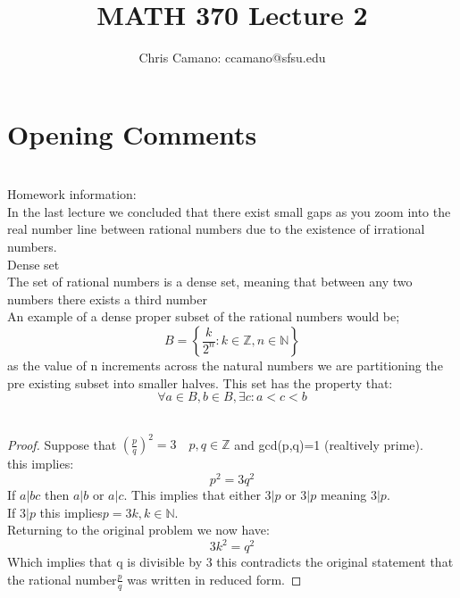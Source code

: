 \documentclass[12pt]{article}
\author{Chris Camano: ccamano@sfsu.edu}
\title{MATH 370  Lecture 2 }
\date
\newcommand{\sect}[1]{\section*{#1}}
\newcommand{\Z}{\mathbb{Z}}
\newcommand{\N}{\mathbb{N}}
\theoremstyle{definition}
\theoremstyle{remark}
\numberwithin{equation}{section}
\begin{document}
\maketitle
\sect{Opening Comments}\\
Homework information: \\
In the last lecture we concluded that there exist small gaps as you zoom into the real number line between rational numbers due to the existence of irrational numbers. \\
 Dense set\\
The set of rational numbers is a dense set, meaning that between any two numbers there exists a third number
\\
An example of a dense proper subset of the rational numbers would be;
\[
   B=\left\{\frac{k}{2^n}: k \in \Z, n \in \N\right\}
\]
as the value of n increments across the natural numbers we are partitioning the pre existing subset into smaller halves. This set has the property that:
\[
  \forall a\in B, b\in B, \exists c: a<c<b
\]\\
\begin{proof}
  Suppose that $\left(\frac{p}{q}\right)^2=3\quad p,q\in \Z$ and gcd(p,q)=1 (realtively prime).\\
  this implies:
  \[
    p^2=3q^2
  \]
  If $a|bc$ then $a|b$ or $a|c$. This implies that either $3|p$ or $3|p$ meaning $3|p$.\\
  If $3|p$ this implies$p=3k,k\in \N$.\\
  Returning to the original problem we now have:
  \[
    3k^2=q^2
  \]
  Which implies that q is divisible by 3 this contradicts the original statement that the rational number$\frac{p}{q}$ was written in reduced form. 
\end{proof}
\end{document}
